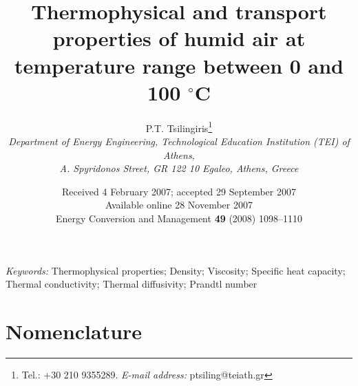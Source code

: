 \documentclass[11pt]{article}
\newcommand{\degC}{$^{\circ}$C}
\begin{document}
\title{Thermophysical and transport properties of humid air at
       temperature range between 0 and 100 \degC}
\author{P.T. Tsilingiris\thanks{Tel.: +30 210 9355289.
        \textit{E-mail address:} ptsiling@teiath.gr} \\[4pt]
        \small\itshape Department of Energy Engineering, Technological
        Education Institution (TEI) of Athens, \\
        \small\itshape A. Spyridonos Street, GR 122 10 Egaleo, Athens, Greece}
\date{\small Received 4 February 2007; accepted 29 September 2007 \\
      Available online 28 November 2007 \\[6pt]
      \normalsize Energy Conversion and Management \textbf{49} (2008) 1098--1110}
\maketitle

\begin{abstract}
\end{abstract}

\noindent\textit{Keywords:} Thermophysical properties; Density;
Viscosity; Specific heat capacity; Thermal conductivity; Thermal
diffusivity; Prandtl number

\section*{Nomenclature}
\end{document}
